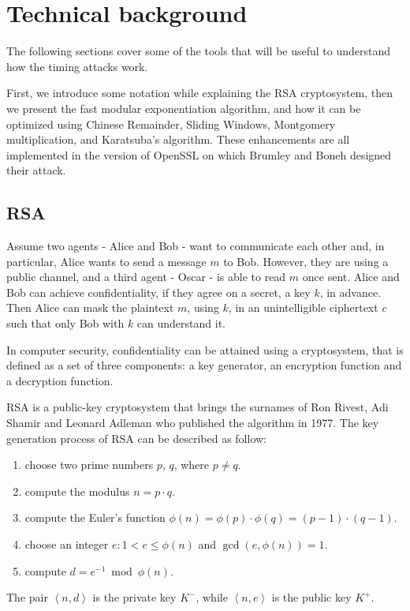 \section{Technical background}\label{sec:technical}
The following sections cover some of the tools that will be useful to understand how the timing attacks work.

First, we introduce some notation while explaining the RSA cryptosystem, then we present the fast modular exponentiation algorithm, and how it can be optimized using Chinese Remainder, Sliding Windows, Montgomery multiplication, and Karatsuba's algorithm. These enhancements are all implemented in the version of OpenSSL on which Brumley and Boneh designed their attack.

\subsection{RSA}
Assume two agents - Alice and Bob - want to communicate each other and, in particular, Alice wants to send a message $m$ to Bob. However, they are using a public channel, and a third agent - Oscar - is able to read $m$ once sent. Alice and Bob can achieve confidentiality, if they agree on a secret, a key $k$, in advance. Then Alice can mask the plaintext $m$, using $k$, in an unintelligible ciphertext $c$ such that only Bob with $k$ can understand it.

In computer security, confidentiality can be attained using a cryptosystem, that is defined as a set of three components: a key generator, an encryption function and a decryption function.

RSA is a public-key cryptosystem that brings the surnames of Ron Rivest, Adi Shamir and Leonard Adleman who published the algorithm in 1977.
The key generation process of RSA can be described as follow:
\begin{enumerate}
  \item choose two prime numbers $p$, $q$, where $p \neq q$.
  \item compute the modulus $n = p \cdot q$.
  \item compute the Euler's function $\phi(n) = \phi(p) \cdot \phi(q) = (p - 1) \cdot (q - 1)$.
  \item choose an integer $e: 1 < e \leq \phi(n)$ and $\gcd(e, \phi(n)) = 1$.
  \item compute $d = e^{-1} \bmod \phi(n)$.
\end{enumerate}
The pair $\left< n, d\right>$ is the private key $K^-$, while $\left< n, e\right>$ is the public key $K^+$.

